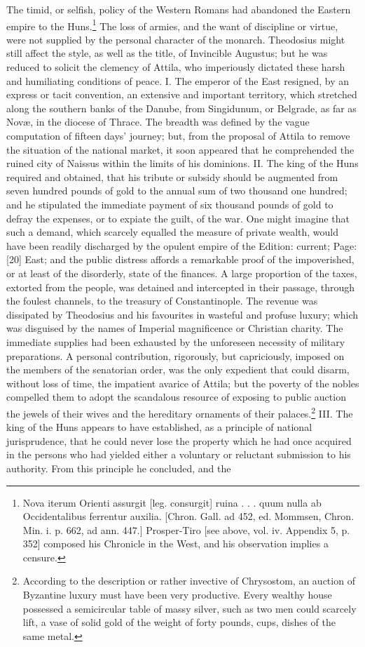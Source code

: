 The timid, or selfish, policy of the Western Romans had abandoned the Eastern empire to the Huns.\footnote{Nova iterum Orienti assurgit [leg. consurgit] ruina . . . quum nulla ab Occidentalibus ferrentur auxilia. [Chron. Gall. ad 452, ed. Mommsen, Chron. Min. i. p. 662, ad ann. 447.] Prosper-Tiro [see above, vol. iv. Appendix 5, p. 352] composed his Chronicle in the West, and his observation implies a censure.} The loss of armies, and the want of discipline or virtue, were not supplied by the personal character of the monarch. Theodosius might still affect the style, as well as the title, of Invincible Augustus; but he was reduced to solicit the clemency of Attila, who imperiously dictated these harsh and humiliating conditions of peace. I. The emperor of the East resigned, by an express or tacit convention, an extensive and important territory, which stretched along the southern banks of the Danube, from Singidunum, or Belgrade, as far as Novæ, in the diocese of Thrace. The breadth was defined by the vague computation of fifteen days\texthebrew{}’ journey; but, from the proposal of Attila to remove the situation of the national market, it soon appeared that he comprehended the ruined city of Naissus within the limits of his dominions. II. The king of the Huns required and obtained, that his tribute or subsidy should be augmented from seven hundred pounds of gold to the annual sum of two thousand one hundred; and he stipulated the immediate payment of six thousand pounds of gold to defray the expenses, or to expiate the guilt, of the war. One might imagine that such a demand, which scarcely equalled the measure of private wealth, would have been readily discharged by the opulent empire of the Edition: current; Page: [20] East; and the public distress affords a remarkable proof of the impoverished, or at least of the disorderly, state of the finances. A large proportion of the taxes, extorted from the people, was detained and intercepted in their passage, through the foulest channels, to the treasury of Constantinople. The revenue was dissipated by Theodosius and his favourites in wasteful and profuse luxury; which was disguised by the names of Imperial magnificence or Christian charity. The immediate supplies had been exhausted by the unforeseen necessity of military preparations. A personal contribution, rigorously, but capriciously, imposed on the members of the senatorian order, was the only expedient that could disarm, without loss of time, the impatient avarice of Attila; but the poverty of the nobles compelled them to adopt the scandalous resource of exposing to public auction the jewels of their wives and the hereditary ornaments of their palaces.\footnote{According to the description or rather invective of Chrysostom, an auction of Byzantine luxury must have been very productive. Every wealthy house possessed a semicircular table of massy silver, such as two men could scarcely lift, a vase of solid gold of the weight of forty pounds, cups, dishes of the same metal.} III. The king of the Huns appears to have established, as a principle of national jurisprudence, that he could never lose the property which he had once acquired in the persons who had yielded either a voluntary or reluctant submission to his authority. From this principle he concluded, and the 
